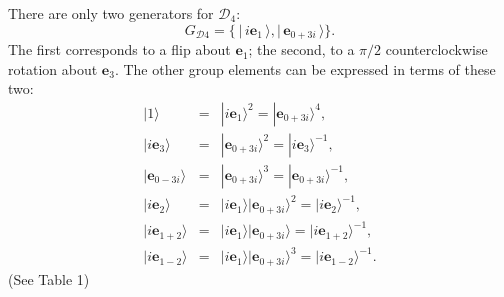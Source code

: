 \documentclass[11pt,twocolumn]{article}
\begin{document}
There are only two generators for $\mathcal D_4$: 
\begin{equation}
G_{\mathcal D4}=\{\ |\,i\mathbf e_1\,\rangle,|\,\mathbf e_{0+3i}\,\rangle\}.
\end{equation}
The first corresponds to a flip about $\mathbf e_1$; the second, to a $\pi/2$ counterclockwise rotation about $\mathbf e_3$.  The other group elements can be expressed in terms of these two:
\begin{eqnarray}
\label{eq:identity as square of G_1 squared is G_3 fourth}
|1\rangle&=&|i\mathbf e_1\rangle^2=|\mathbf e_{0+3i}\rangle^4,\\
\label{eq:ie_3 is G_3 squared}
|i\mathbf e_3\rangle&=&|\mathbf e_{0+3i}\rangle^2=|i\mathbf e_3\rangle^{-1},\\
\label{eq:e_0-3i is G_3 cube is e_0+3i inverse}
|\mathbf e_{0-3i}\rangle&=&|\mathbf e_{0+3i}\rangle^3=|\mathbf e_{0+3i}\rangle^{-1},\\
\label{eq:ie_2 is G_1 G_3 squared is ie_2 inverse}
|i\mathbf e_2\rangle&=&|i\mathbf e_1\rangle|\mathbf e_{0+3i}\rangle^2=|i\mathbf e_2\rangle^{-1},\\
\label{eq:ie_1+2 is G_1 G_3 is ie_1+2 inverse}
|i\mathbf e_{1+2}\rangle&=&|i\mathbf e_1\rangle|\mathbf e_{0+3i}\rangle=|i\mathbf e_{1+2}\rangle^{-1},\\
\label{eq:ie_1-2 is G_1 G_3 cube is ie_1+2 inverse}
|i\mathbf e_{1-2}\rangle&=&|i\mathbf e_1\rangle|\mathbf e_{0+3i}\rangle^3=|i\mathbf e_{1-2}\rangle^{-1}.
\end{eqnarray}
(See Table 1)
\end{document}
